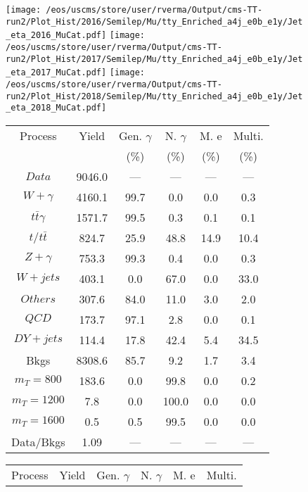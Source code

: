 \begin{figure}
\centering
\texttt{[image: /eos/uscms/store/user/rverma/Output/cms-TT-run2/Plot\_Hist/2016/Semilep/Mu/tty\_Enriched\_a4j\_e0b\_e1y/Jet\_eta\_2016\_MuCat.pdf]}
\texttt{[image: /eos/uscms/store/user/rverma/Output/cms-TT-run2/Plot\_Hist/2017/Semilep/Mu/tty\_Enriched\_a4j\_e0b\_e1y/Jet\_eta\_2017\_MuCat.pdf]}
\texttt{[image: /eos/uscms/store/user/rverma/Output/cms-TT-run2/Plot\_Hist/2018/Semilep/Mu/tty\_Enriched\_a4j\_e0b\_e1y/Jet\_eta\_2018\_MuCat.pdf]}
\begin{minipage}[c]{0.32\textwidth}
\centering
\tiny{
\begin{tabular}{cccccc}
\hline
Process & Yield & Gen. $\gamma$ & N. $\gamma$ & M. e & Multi. \\
 &  & (\%) & (\%) & (\%) & (\%)  \\
\hline
                                                                      $ Data $ &  9046.0 &  --- &  --- &  --- &  ---\\
$ W+\gamma $ &  4160.1 &  99.7 &  0.0 &  0.0 &  0.3\\
$ t\bar{t}\gamma $ &  1571.7 &  99.5 &  0.3 &  0.1 &  0.1\\
$ t/t\bar{t} $ &  824.7 &  25.9 &  48.8 &  14.9 &  10.4\\
$ Z+\gamma $ &  753.3 &  99.3 &  0.4 &  0.0 &  0.3\\
$ W+jets $ &  403.1 &  0.0 &  67.0 &  0.0 &  33.0\\
$ Others $ &  307.6 &  84.0 &  11.0 &  3.0 &  2.0\\
$ QCD $ &  173.7 &  97.1 &  2.8 &  0.0 &  0.1\\
$ DY+jets $ &  114.4 &  17.8 &  42.4 &  5.4 &  34.5\\
Bkgs &  8308.6 &  85.7 &  9.2 &  1.7 &  3.4\\
$ m_{T} = 800 $ &  183.6 &  0.0 &  99.8 &  0.0 &  0.2\\
$ m_{T} = 1200 $ &  7.8 &  0.0 &  100.0 &  0.0 &  0.0\\
$ m_{T} = 1600 $ &  0.5 &  0.5 &  99.5 &  0.0 &  0.0\\
Data/Bkgs &  1.09 &  --- &  --- &  --- &  ---\\
\hline
\end{tabular}
}
\end{minipage}
\begin{minipage}[c]{0.32\textwidth}
\centering
\tiny{
\begin{tabular}{cccccc}
\hline
Process & Yield & Gen. $\gamma$ & N. $\gamma$ & M. e & Multi. \\

\end{tabular}}
\end{minipage}
\end{figure}
